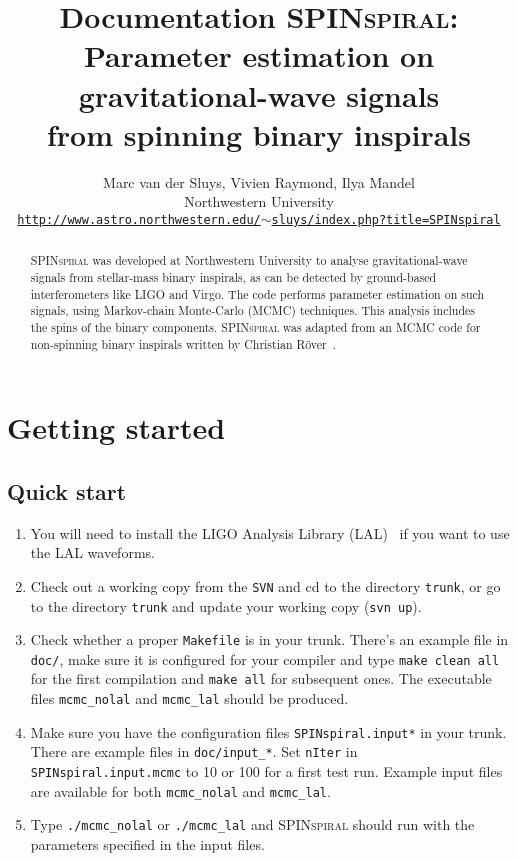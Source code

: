 \documentclass[10pt]{article}
\title{Documentation \textsc{SPINspiral}:\\
  Parameter estimation on gravitational-wave signals\\
  from spinning binary inspirals}
\author{Marc van der Sluys, Vivien Raymond, Ilya Mandel \\
  Northwestern University \\
  \small\texttt{\href{http://www.astro.northwestern.edu/~sluys/index.php?title=SPINspiral}{http://www.astro.northwestern.edu/$\sim$sluys/index.php?title=SPINspiral}}}
\begin{document}
\maketitle




\begin{abstract}
  \textsc{SPINspiral} was developed at Northwestern University to analyse gravitational-wave signals from
  stellar-mass binary inspirals, as can be detected by ground-based interferometers like LIGO and Virgo.  
  The code performs parameter estimation on such signals, using Markov-chain Monte-Carlo (MCMC) techniques.
  This analysis includes the spins of the binary components.  \textsc{SPINspiral} was adapted from an MCMC 
  code for non-spinning binary inspirals written by Christian R\"over~\cite{RoeverThesis2007}.
\end{abstract}

\tableofcontents

\pagebreak


\section{Getting started}

\subsection{Quick start}

\begin{enumerate}
\item You will need to install the LIGO Analysis Library (LAL)~\cite{lal} if you want to use the LAL waveforms.
\item Check out a working copy from the \texttt{SVN} and cd to the directory \texttt{trunk}, or go to the
  directory \texttt{trunk} and update your working copy (\texttt{svn up}).
\item Check whether a proper \texttt{Makefile} is in your trunk.  There's an example file in \texttt{doc/}, 
  make sure it is configured for your compiler and type \texttt{make clean all} for the first compilation
  and \texttt{make all} for subsequent ones.  The executable files \texttt{mcmc\_nolal} and \texttt{mcmc\_lal} should be produced.
\item Make sure you have the configuration files \texttt{SPINspiral.input*} in your trunk.  There are example
  files in \texttt{doc/input\_*}.  Set \texttt{nIter} in \texttt{SPINspiral.input.mcmc} to 10 or 100 for a first test run.
  Example input files are available for both \texttt{mcmc\_nolal} and \texttt{mcmc\_lal}.
\item Type \texttt{./mcmc\_nolal} or \texttt{./mcmc\_lal} and \textsc{SPINspiral} should run with the parameters specified
  in the input files.
\end{enumerate}
\end{document}
